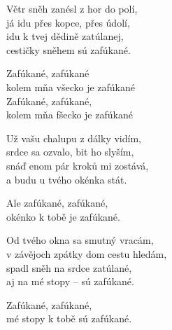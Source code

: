 
\ve{}
Větr sněh zanésl z hor do polí,\\
já idu přes kopce, přes údolí,\\
idu k tvej dědině zatúlanej,\\
cestičky sněhem sú zafúkané. \hspace{1em}

\cho{}
Zafúkané, zafúkané\\
kolem mňa všecko je zafúkané\\
Zafúkané, zafúkané,\\
kolem mňa fšecko je zafúkané

\ve{}
Už vašu chalupu z dálky vidím,\\
srdce sa ozvalo, bit ho slyším,\\
snáď enom pár kroků mi zostává,\\
a budu u tvého okénka stát.

\cho{}
Ale zafúkané, zafúkané,\\
okénko k tobě je zafúkané.

\ve{}
Od tvého okna sa smutný vracám,\\
v závějoch zpátky dom cestu hledám,\\
spadl sněh na srdce zatúlané,\\
aj na mé stopy -- sú zafúkané.

\cho{}
Zafúkané, zafúkané,\\
mé stopy k tobě sú zafúkané.

\esong